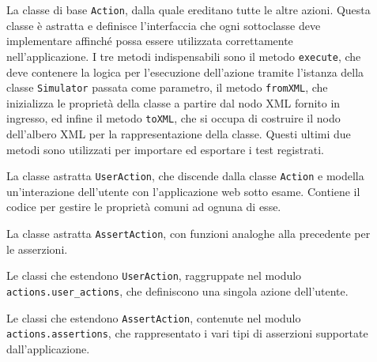 \begin{description}
\item[ ] La classe di base \verb|Action|, dalla quale ereditano tutte le altre azioni. Questa classe è astratta e definisce l'interfaccia che ogni sottoclasse deve implementare affinché possa essere utilizzata correttamente nell'applicazione.
I tre metodi indispensabili sono il metodo \verb|execute|, che deve contenere la logica per l'esecuzione dell'azione tramite l'istanza della classe \verb|Simulator| passata come parametro, il metodo \verb|fromXML|, che inizializza le proprietà della classe a partire dal nodo XML fornito in ingresso, ed infine il metodo \verb|toXML|, che si occupa di costruire il nodo dell'albero XML per la rappresentazione della classe. Questi ultimi due metodi sono utilizzati per importare ed esportare i test registrati.

\item[ ] La classe astratta \verb|UserAction|, che discende dalla classe \verb|Action| e modella un'interazione dell'utente con l'applicazione web sotto esame. Contiene il codice per gestire le proprietà comuni ad ognuna di esse.

\item[ ] La classe astratta \verb|AssertAction|, con funzioni analoghe alla precedente per le asserzioni.

\item[ ] Le classi che estendono \verb|UserAction|, raggruppate nel modulo \verb|actions.user_actions|, che definiscono una singola azione dell'utente.

\item[ ] Le classi che estendono \verb|AssertAction|, contenute nel modulo \verb|actions.assertions|, che rappresentato i vari tipi di asserzioni supportate dall'applicazione.
 
\end{description}

